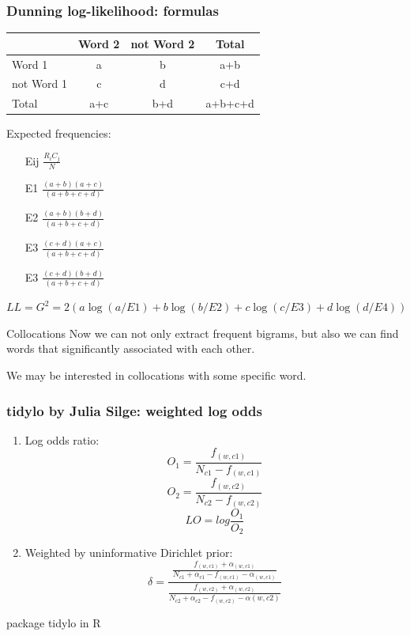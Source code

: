 \documentclass[svgnames]{beamer}
\begin{document}
\begin{frame}
  \frametitle{Dunning log-likelihood: formulas}
  \begin{tabular}[c]{|p{}|c|c|c|}
    \hline
   & Word 2 & not Word 2 & Total \\
    \hline
    Word 1 & a & b & a+b \\
    \hline
    not Word 1 & c & d & c+d \\
    \hline
    Total & a+c & b+d & a+b+c+d \\
    \hline
  \end{tabular}

\bigskip
  Expected frequencies:
  \begin{itemize}
  \item[Eij] $\frac{R_iC_j}{N}$
  \item[E1] $\frac{(a+b)(a+c)}{(a+b+c+d)}$
  \item[E2] $\frac{(a+b)(b+d)}{(a+b+c+d)}$
  \item[E3] $\frac{(c+d)(a+c)}{(a+b+c+d)}$
  \item[E3] $\frac{(c+d)(b+d)}{(a+b+c+d)}$
  \end{itemize}

    $LL = G^2 = 2 (a \log (a/E1) + b \log (b/E2) +c \log(c/E3) + d \log(d/E4))$

\end{frame}


\begin{frame}{Collocations}
  Now we can not only extract frequent bigrams, but also we can find words that significantly associated with each other.

  We may be interested in collocations with some specific word.
\end{frame}


\begin{frame}
  \frametitle{tidylo by Julia Silge: weighted log odds}
  \begin{enumerate}
  \item Log odds ratio:
    $$
    O_1 = \frac{f_{(w,c1)}}{N_{c1}-f_{(w,c1)}}
    $$
    $$
    O_2 = \frac{f_{(w,c2)}}{N_{c2}-f_{(w,c2)}}
    $$
    $$
    LO = log \frac{O_1}{O_2}
    $$
  \item Weighted by uninformative Dirichlet prior:
    $$
    \delta =
    \frac{\frac{f_{(w,c1)}+\alpha_{(w,c1)}}{N_{c1}+\alpha_{c1}-f_{(w,c1)}-\alpha_{(w,c1)}}}{\frac{f_{(w,c2)}+\alpha_{(w,c2)}}{N_{c2}+\alpha_{c2}-f_{(w,c2)}-\alpha{(w,c2)}}}
    $$
  \end{enumerate}

  package tidylo in R
\end{frame}
\end{document}
